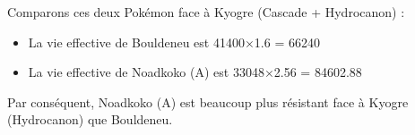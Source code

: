 \documentclass[12pt]{beamer}
\begin{document}
\begin{frame}
\begin{block}{}
\begin{footnotesize}
\begin{itemize}
  Comparons ces deux Pok\'emon face à Kyogre (Cascade + Hydrocanon) :
  \begin{itemize}
  \item \footnotesize La vie effective de Bouldeneu est 41400$\times$1.6 = 66240
  \item\footnotesize La vie effective de Noadkoko (A) est 33048$\times$2.56 = 84602.88
\end{itemize}
Par conséquent, Noadkoko (A) est beaucoup plus résistant face à Kyogre (Hydrocanon) que Bouldeneu.
\end{itemize}

\end{footnotesize}
\end{block}
\end{frame}
\end{document}

